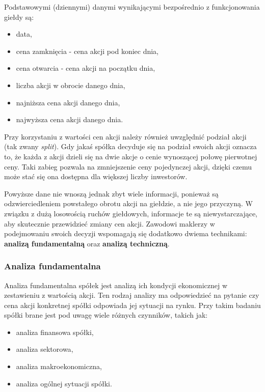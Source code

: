 \documentclass[a4paper, twoside, 11pt, openright]{article}
\begin{document}
Podstawowymi (dziennymi) danymi wynikającymi bezpośrednio z funkcjonowania giełdy są:

\begin{itemize}
\item{data},
\item{cena zamknięcia} - cena akcji pod koniec dnia,
\item{cena otwarcia} - cena akcji na początku dnia,
\item{liczba akcji w obrocie danego dnia},
\item{najniższa cena akcji danego dnia},
\item{najwyższa cena akcji danego dnia}.
\end{itemize}

 Przy korzystaniu z wartości cen akcji należy również uwzględnić podział akcji (tak zwany \textit{split}). Gdy jakaś spółka decyduje się na podział swoich akcji oznacza to, że każda z akcji dzieli się na dwie akcje o cenie wynoszącej połowę pierwotnej ceny. Taki zabieg pozwala na zmniejszenie ceny pojedynczej akcji, dzięki czemu może stać się ona dostępna dla większej liczby inwestorów. 
 
\bigskip

Powyższe dane nie wnoszą jednak zbyt wiele informacji, ponieważ są odzwierciedleniem powstałego obrotu akcji na giełdzie, a nie jego przyczyną. W związku z dużą losowością ruchów giełdowych, informacje te są niewystarczające, aby skutecznie przewidzieć zmiany cen akcji. Zawodowi maklerzy w podejmowaniu swoich decyzji wspomagają się dodatkowo dwiema technikami: \textbf{analizą fundamentalną} oraz \textbf{analizą techniczną}.

\subsubsection{Analiza fundamentalna}

Analiza fundamentalna \cite{fundamentalanalysis} spółek jest analizą ich kondycji ekonomicznej w zestawieniu z wartością akcji. Ten rodzaj analizy ma odpowiedzieć na pytanie czy cena akcji konkretnej spółki odpowiada jej sytuacji na rynku. Przy takim badaniu spółki brane jest pod uwagę wiele różnych czynników, takich jak:
\begin{itemize}
\item{analiza finansowa spółki},
\item{analiza sektorowa},
\item{analiza makroekonomiczna},
\item{analiza ogólnej sytuacji spółki}.
\end{itemize}
\end{document}
